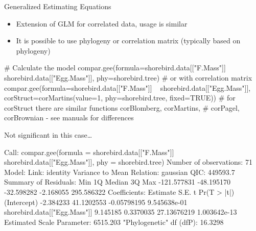 \documentclass[compress, ucs, xelatex, 11pt, xcolor=svgnames, aspectratio=169,
	hyperref={
		bookmarks=true,
		unicode=true,
		colorlinks=true,
		pdftitle={Molecular data in R},
		plainpages=false,
		pdfauthor={Vojtech Zeisek},
		pdfsubject={Course about phylogeny and evolution in R},
		pdfcreator={XeLaTeX},
		pdfkeywords={R, evolution, phylogeny, molecular data},
		linkcolor=Crimson, %
		anchorcolor=Magenta, %
		citecolor=Magenta, %
		filecolor=Magenta, %
		menucolor=Magenta, %
		urlcolor=DodgerBlue, %
		pdftex},
	url={hyphens, lowtilde} %
	]{beamer}
\begin{document}
\begin{frame}[fragile]{Generalized Estimating Equations}
	\begin{itemize}
		\item Extension of GLM for correlated data, usage is similar
		\item It is possible to use phylogeny or correlation matrix (typically based on phylogeny)
	\end{itemize}
	\vfil
	\begin{spluscode}
    # Calculate the model
    compar.gee(formula=shorebird.data[["F.Mass"]] ~
      shorebird.data[["Egg.Mass"]], phy=shorebird.tree)
    # or with correlation matrix
    compar.gee(formula=shorebird.data[["F.Mass"]] ~
      shorebird.data[["Egg.Mass"]], corStruct=corMartins(value=1,
      phy=shorebird.tree, fixed=TRUE))
    # for corStruct there are similar functions corBlomberg, corMartins,
    # corPagel, corBrownian - see manuals for differences
	\end{spluscode}
\end{frame}

\begin{frame}[fragile]{Not significant in this case\ldots}
	\begin{spluscode}
    Call: compar.gee(formula = shorebird.data[["F.Mass"]] ~
      shorebird.data[["Egg.Mass"]], phy = shorebird.tree)
    Number of observations:  71 
    Model:
                          Link: identity 
     Variance to Mean Relation: gaussian 
    QIC: 449593.7 
    Summary of Residuals:
            Min          1Q      Median          3Q         Max 
    -121.577831  -48.195170  -32.598282   -2.168055  295.586322 
    Coefficients:
                                  Estimate       S.E.           t  Pr(T > |t|)
    (Intercept)                  -2.384233 41.1202553 -0.05798195 9.545638e-01
    shorebird.data[["Egg.Mass"]]  9.145185  0.3370035 27.13676219 1.003642e-13
    Estimated Scale Parameter:  6515.203
    "Phylogenetic" df (dfP):  16.3298 
	\end{spluscode}
\end{frame}

%
%
\end{document}
